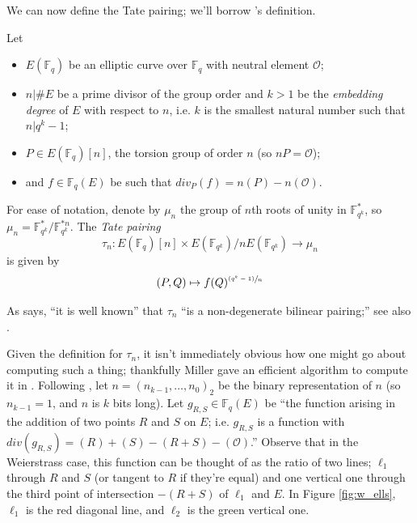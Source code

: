 We can now define the Tate pairing; we'll borrow \cite{arene2011faster}'s
    definition.

\begin{dfn}
Let
\begin{itemize}
\item   $E(\mathbb{F}_q)$ be an elliptic curve over $\mathbb{F}_q$ with neutral
    element $\mathcal{O}$;
\item   $n \vert \#E$ be a prime divisor of the group order and $k > 1$ be the 
    \textit{embedding degree} of $E$ with respect to $n$, i.e. $k$ is the
    smallest natural number such that $n \vert q^k - 1$;
\item   $P \in E(\mathbb{F}_q)[n]$, the torsion group of order $n$ (so $nP =
    \mathcal{O}$);
\item   and $f \in \mathbb{F}_q(E)$ be such that $div_P(f) = n(P) -
    n(\mathcal{O})$.
\end{itemize}
For ease of notation, denote by $\mu_n$ the group of $n$th roots of unity in
    $\mathbb{F}_{q^k}^\ast$, so $\mu_n = \mathbb{F}_{q^k}^\ast /
    \mathbb{F}_{q^k}^{\ast n}$.
The \textit{Tate pairing}
\[
\tau_n :
    E(\mathbb{F}_q)[n] \times E(\mathbb{F}_{q^k})/nE(\mathbb{F}_{q^k})
    \to
    \mu_n
\]
    is given by
\[
(P, Q) \mapsto f(Q)^{\sfrac{(q^k - 1)}{n}}
\]
\end{dfn}

As \cite{kwon2005efficient} says, ``it is well known'' that $\tau_n$ ``is a
    non-degenerate bilinear pairing;'' see also
    \cite{galbraith2002implementing}.


Given the definition for $\tau_n$, it isn't immediately obvious how one might
    go about computing such a thing; thankfully Miller gave an efficient
    algorithm to compute it in \cite{miller2004weil}.
Following \cite{arene2011faster}, let $n = (n_{k - 1},\ldots,n_0)_2$ be the
    binary representation of $n$ (so $n_{k - 1} = 1$, and $n$ is $k$ bits
    long).
Let $g_{R, S} \in \mathbb{F}_q(E)$ be ``the function arising in the addition of
    two points $R$ and $S$ on $E$; i.e. $g_{R, S}$ is a function with
    $div(g_{R,S}) = (R) + (S) - (R + S) - (\mathcal{O})$.''
    \cite{arene2011faster}
Observe that in the Weierstrass case, this function can be thought of as the
    ratio of two lines; $\ell_1$ through $R$ and $S$ (or tangent to $R$ if
    they're equal) and one vertical one through the third point of intersection
    $-(R + S)$ of $\ell_1$ and $E$.
In Figure \ref{fig:w_ells}, $\ell_1$ is the red diagonal line, and $\ell_2$ is
    the green vertical one.

